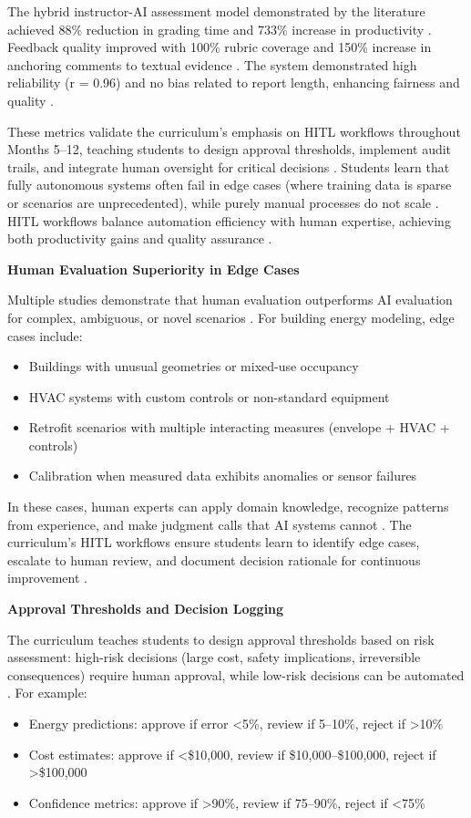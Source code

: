 \documentclass[12pt,a4paper]{article}
\begin{document}
The hybrid instructor-AI assessment model demonstrated by the literature achieved 88\% reduction in grading time and 733\% increase in productivity \cite{ref314}. Feedback quality improved with 100\% rubric coverage and 150\% increase in anchoring comments to textual evidence \cite{ref315}. The system demonstrated high reliability (r = 0.96) and no bias related to report length, enhancing fairness and quality \cite{ref316}.

These metrics validate the curriculum's emphasis on HITL workflows throughout Months 5--12, teaching students to design approval thresholds, implement audit trails, and integrate human oversight for critical decisions \cite{ref317}. Students learn that fully autonomous systems often fail in edge cases (where training data is sparse or scenarios are unprecedented), while purely manual processes do not scale \cite{ref318}. HITL workflows balance automation efficiency with human expertise, achieving both productivity gains and quality assurance \cite{ref319}.

\textbf{Human Evaluation Superiority in Edge Cases}

Multiple studies demonstrate that human evaluation outperforms AI evaluation for complex, ambiguous, or novel scenarios \cite{ref320}. For building energy modeling, edge cases include:
\begin{itemize}
  \item Buildings with unusual geometries or mixed-use occupancy \cite{ref321}
  \item HVAC systems with custom controls or non-standard equipment \cite{ref322}
  \item Retrofit scenarios with multiple interacting measures (envelope + HVAC + controls) \cite{ref323}
  \item Calibration when measured data exhibits anomalies or sensor failures \cite{ref324}
\end{itemize}

In these cases, human experts can apply domain knowledge, recognize patterns from experience, and make judgment calls that AI systems cannot \cite{ref325}. The curriculum's HITL workflows ensure students learn to identify edge cases, escalate to human review, and document decision rationale for continuous improvement \cite{ref326}.

\textbf{Approval Thresholds and Decision Logging}

The curriculum teaches students to design approval thresholds based on risk assessment: high-risk decisions (large cost, safety implications, irreversible consequences) require human approval, while low-risk decisions can be automated \cite{ref327}. For example:
\begin{itemize}
  \item Energy predictions: approve if error <5\%, review if 5--10\%, reject if >10\% \cite{ref328}
  \item Cost estimates: approve if <\$10,000, review if \$10,000--\$100,000, reject if >\$100,000 \cite{ref329}
  \item Confidence metrics: approve if >90\%, review if 75--90\%, reject if <75\% \cite{ref330}
\end{itemize}
\end{document}
